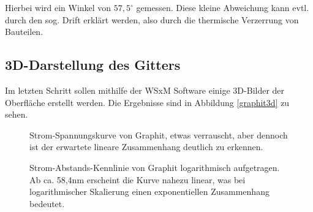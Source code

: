 Hierbei wird ein Winkel von $57,5^\circ$ gemessen. Diese kleine Abweichung
kann evtl. durch den sog. Drift erklärt werden, also durch die thermische Verzerrung von Bauteilen.

\subsection{3D-Darstellung des Gitters}
Im letzten Schritt sollen mithilfe der WSxM \cite{wsxm} Software einige 
3D-Bilder der 
Oberfläche erstellt werden. Die Ergebnisse sind in Abbildung \ref{graphit3d}
zu sehen.

\begin{figure}[H]
	\centering
	\caption{Strom-Spannungskurve von Graphit, etwas verrauscht, aber dennoch ist der erwartete lineare Zusammenhang deutlich zu erkennen.}
	\label{graphui}
\end{figure}

\begin{figure}[H]
	\centering
	\caption{Strom-Abstands-Kennlinie von Graphit logarithmisch aufgetragen. Ab ca. 58,4nm erscheint die Kurve nahezu linear, was bei logarithmischer Skalierung einen exponentiellen Zusammenhang bedeutet.}
	\label{graphdi}
\end{figure}

